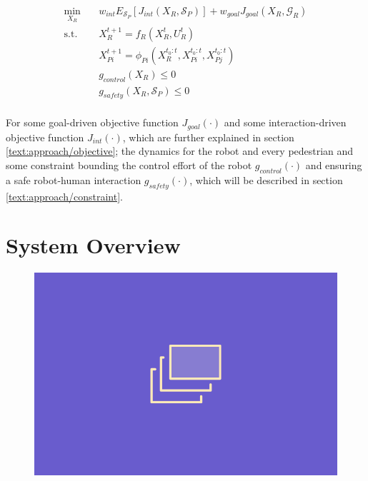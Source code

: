\begin{align}
\label{eq:formulation}
\min_{X_R} \quad & w_{int} E_{\mathcal{S}_P}[J_{int}(X_R, \mathcal{S}_P)] + w_{goal} J_{goal}(X_R, \mathcal{G}_R) \\
\textrm{s.t. } \quad & X_R^{t+1} = f_R(X_R^t, U_R^t) \\
& X_{Pi}^{t+1} = \phi_{Pi}(X_R^{t_0:t}, X_{Pi}^{t_0:t}, X_{Pj}^{t_0:t}) \\
& g_{control}(X_R) \leq 0 \\
& g_{safety}(X_R, \mathcal{S}_P) \leq 0 \\
\end{align} 

For some goal-driven objective function $J_{goal}(\cdot)$ and some interaction-driven objective function $J_{int}(\cdot)$, which are further explained in section \ref{text:approach/objective}; the dynamics for the robot and every pedestrian and some constraint bounding the control effort of the robot $g_{control}(\cdot)$ and ensuring a safe robot-human interaction $g_{safety}(\cdot)$, which will be described in section \ref{text:approach/constraint}.

\section{System Overview}
\label{text:approach/overview}

\begin{figure}[!ht]
\begin{center}
\includegraphics[width=\imgwidth]{images/placeholder.png}
\label{img:information_flow}
\end{center}
\end{figure}

